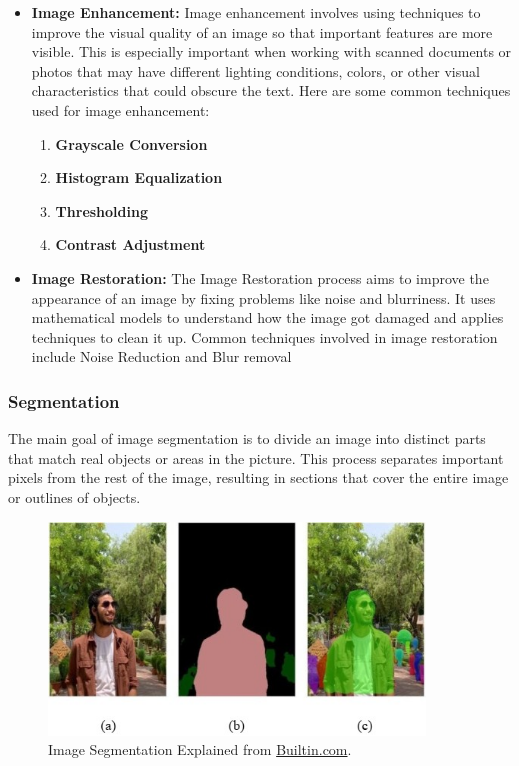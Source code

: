 \documentclass[12pt,oneside,openright,a4paper]{cpe-english-project}
\begin{document}
\begin{itemize}
    \item \textbf{Image Enhancement:}  Image enhancement involves using techniques to improve the visual quality of an image so that important features are more visible. This is especially important when working with scanned documents or photos that may have different lighting conditions, colors, or other visual characteristics that could obscure the text. Here are some common techniques used for image enhancement:
	\begin{enumerate}
    		\item \textbf{Grayscale Conversion}
    		\item \textbf{Histogram Equalization}
   		 \item \textbf{Thresholding}
   		 \item \textbf{Contrast Adjustment}
	\end{enumerate}
 
    \item \textbf{Image Restoration:} The Image Restoration process aims to improve the appearance of an image by fixing problems like noise and blurriness. It uses mathematical models to understand how the image got damaged and applies techniques to clean it up. Common techniques involved in image restoration include Noise Reduction and Blur removal 
\end{itemize}

\subsubsection{Segmentation} The main goal of image segmentation is to divide an image into distinct parts that match real objects or areas in the picture. This process separates important pixels from the rest of the image, resulting in sections that cover the entire image or outlines of objects.

\begin{figure}[H]
    \centering
    \includegraphics[width=10cm]{./assets/segmentation.jpg}
    \caption{Image Segmentation Explained from 
    \href{https://builtin.com/sites/www.builtin.com/files/styles/ckeditor_optimize/public/inline-images/1_image-segmentation\%202.jpeg}{Builtin.com}.}
    \label{fig:figure-2.1}  
\end{figure}
\end{document}
